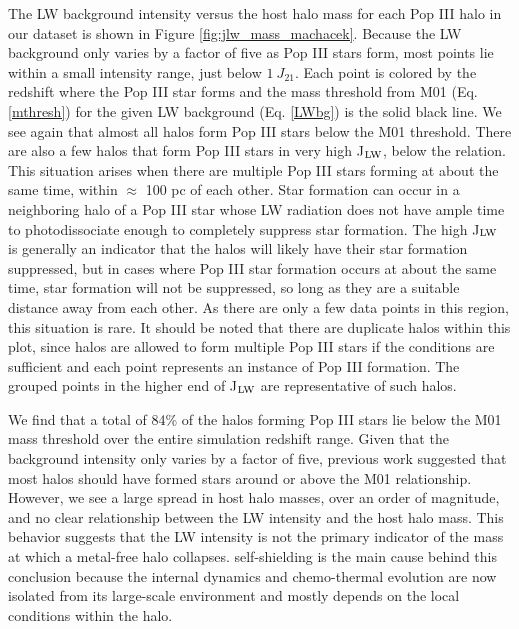 \documentclass[fleqn,usenatbib]{mnras}
\begin{document}
The LW background intensity versus the host halo mass for each Pop III halo in our dataset is shown in Figure \ref{fig:jlw_mass_machacek}. Because the LW background only varies by a factor of five as Pop III stars form, most points lie within a small intensity range, just below $1~J_{21}$. Each point is colored by the redshift where the Pop III star forms and the mass threshold from M01 (Eq. \ref{mthresh}) for the given LW background (Eq. \ref{LWbg}) is the solid black line. We see again that almost all halos form Pop III stars below the M01 threshold. There are also a few halos that form Pop III stars in very high J$_{\rm LW}$, below the relation. This situation arises when there are multiple Pop III stars forming at about the same time, within $\approx$ 100 pc of each other. Star formation can occur in a neighboring halo of a Pop III star whose LW radiation does not have ample time to photodissociate enough \hh{} to completely suppress star formation. The high J$_{\rm LW}$ is generally an indicator that the halos will likely have their star formation suppressed, but in cases where Pop III star formation occurs at about the same time, star formation will not be suppressed, so long as they are a suitable distance away from each other. As there are only a few data points in this region, this situation is rare. It should be noted that there are duplicate halos within this plot, since halos are allowed to form multiple Pop III stars if the conditions are sufficient and each point represents an instance of Pop III formation. The grouped points in the higher end of J$_{\rm LW}$ are representative of such halos. 

We find that a total of 84\% of the halos forming Pop III stars lie below the M01 mass threshold over the entire simulation redshift range.  Given that the background intensity only varies by a factor of five, previous work suggested that most halos should have formed stars around or above the M01 relationship.  However, we see a large spread in host halo masses, over an order of magnitude, and no clear relationship between the LW intensity and the host halo mass. This behavior suggests that the LW intensity is not the primary indicator of the mass at which a metal-free halo collapses. \hh{} self-shielding is the main cause behind this conclusion because the internal dynamics and chemo-thermal evolution are now isolated from its large-scale environment and mostly depends on the local conditions within the halo.
\end{document}
